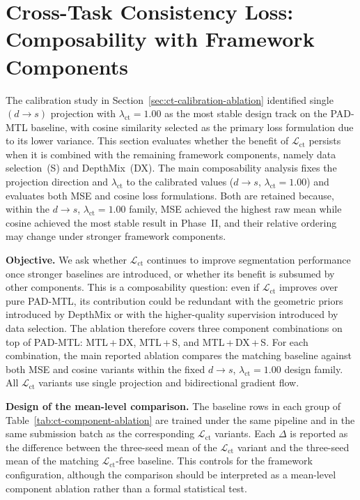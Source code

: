 \section{Cross-Task Consistency Loss: Composability with Framework Components}
\label{sec:ct-component-ablation}

\noindent
The calibration study in Section~\ref{sec:ct-calibration-ablation}
identified single~$(d{\rightarrow}s)$ projection with
$\lambda_\text{ct}=1.00$ as the most stable design track on the PAD-MTL
baseline, with cosine similarity selected as the primary loss formulation
due to its lower variance. This section evaluates whether the benefit of
$\mathcal{L}_\text{ct}$ persists when it is combined with the remaining
framework components, namely data selection~(S) and DepthMix~(DX). The
main composability analysis fixes the projection direction and
$\lambda_\text{ct}$ to the calibrated values ($d{\rightarrow}s$,
$\lambda_\text{ct}=1.00$) and evaluates both MSE and cosine loss
formulations. Both are retained because, within the $d{\rightarrow}s$,
$\lambda_\text{ct}=1.00$ family, MSE achieved the highest raw mean while
cosine achieved the most stable result in Phase~II, and their relative
ordering may change under stronger framework components.

\vspace{4pt}
\noindent
\textbf{Objective.}
We ask whether $\mathcal{L}_\text{ct}$ continues to improve segmentation
performance once stronger baselines are introduced, or whether its
benefit is subsumed by other components. This is a composability
question: even if $\mathcal{L}_\text{ct}$ improves over pure PAD-MTL,
its contribution could be redundant with the geometric priors introduced
by DepthMix or with the higher-quality supervision introduced by data
selection. The ablation therefore covers three component combinations on
top of PAD-MTL: MTL\,+\,DX, MTL\,+\,S, and MTL\,+\,DX\,+\,S. For each
combination, the main reported ablation compares the matching baseline
against both MSE and cosine variants within the fixed
$d{\rightarrow}s$, $\lambda_\text{ct}=1.00$ design family. All
$\mathcal{L}_\text{ct}$ variants use single projection and
bidirectional gradient flow.

\vspace{4pt}
\noindent
\textbf{Design of the mean-level comparison.}
The baseline rows in each group of
Table~\ref{tab:ct-component-ablation} are trained under the same
pipeline and in the same submission batch as the corresponding
$\mathcal{L}_\text{ct}$ variants. Each $\Delta$ is reported as the
difference between the three-seed mean of the $\mathcal{L}_\text{ct}$
variant and the three-seed mean of the matching
$\mathcal{L}_\text{ct}$-free baseline. This controls for the framework
configuration, although the comparison should be interpreted as a
mean-level component ablation rather than a formal statistical test.

